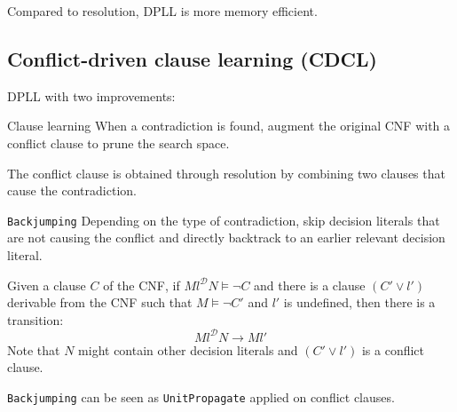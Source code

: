 \begin{remark}
    Compared to resolution, DPLL is more memory efficient.
\end{remark}



\subsection{Conflict-driven clause learning (CDCL)}

DPLL with two improvements:
\begin{descriptionlist}
    \item[Clause learning] 
        When a contradiction is found, augment the original CNF with a conflict clause
        to prune the search space.

        The conflict clause is obtained through resolution by combining two clauses that cause the contradiction.

    \item[\texttt{Backjumping}]
        Depending on the type of contradiction, skip decision literals that are not causing the conflict
        and directly backtrack to an earlier relevant decision literal.

        Given a clause $C$ of the CNF, if $Ml^\mathcal{D}N \models \lnot C$ and 
        there is a clause $(C' \vee l')$ derivable from the CNF such that $M \models \lnot C'$ and
        $l'$ is undefined, then there is a transition:
        \[ Ml^\mathcal{D}N \rightarrow Ml' \] 
        Note that $N$ might contain other decision literals and $(C' \vee l')$ is a conflict clause.

        \begin{remark}
            \texttt{Backjumping} can be seen as \texttt{UnitPropagate} applied on conflict clauses.
        \end{remark}
\end{descriptionlist}

